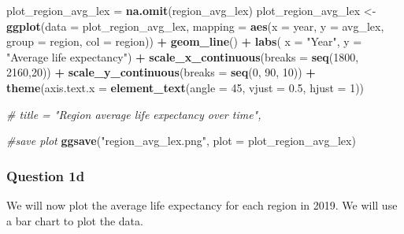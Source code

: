 \documentclass[
]{article}
\newenvironment{Shaded}{\begin{snugshade}}{\end{snugshade}}
\newcommand{\AttributeTok}[1]{\textcolor[rgb]{0.13,0.29,0.53}{#1}}
\newcommand{\CommentTok}[1]{\textcolor[rgb]{0.56,0.35,0.01}{\textit{#1}}}
\newcommand{\DecValTok}[1]{\textcolor[rgb]{0.00,0.00,0.81}{#1}}
\newcommand{\FloatTok}[1]{\textcolor[rgb]{0.00,0.00,0.81}{#1}}
\newcommand{\FunctionTok}[1]{\textcolor[rgb]{0.13,0.29,0.53}{\textbf{#1}}}
\newcommand{\NormalTok}[1]{#1}
\newcommand{\OtherTok}[1]{\textcolor[rgb]{0.56,0.35,0.01}{#1}}
\newcommand{\SpecialCharTok}[1]{\textcolor[rgb]{0.81,0.36,0.00}{\textbf{#1}}}
\newcommand{\StringTok}[1]{\textcolor[rgb]{0.31,0.60,0.02}{#1}}
\begin{document}
\begin{Shaded}
\begin{Highlighting}[]
\NormalTok{plot\_region\_avg\_lex }\OtherTok{=} \FunctionTok{na.omit}\NormalTok{(region\_avg\_lex)}
\NormalTok{plot\_region\_avg\_lex }\OtherTok{\textless{}{-}} \FunctionTok{ggplot}\NormalTok{(}\AttributeTok{data =}\NormalTok{ plot\_region\_avg\_lex, }\AttributeTok{mapping =} \FunctionTok{aes}\NormalTok{(}\AttributeTok{x =}\NormalTok{ year, }\AttributeTok{y =}\NormalTok{ avg\_lex, }\AttributeTok{group =}\NormalTok{ region, }\AttributeTok{col =}\NormalTok{ region)) }\SpecialCharTok{+}
  \FunctionTok{geom\_line}\NormalTok{() }\SpecialCharTok{+}
  \FunctionTok{labs}\NormalTok{(}
       \AttributeTok{x =} \StringTok{"Year"}\NormalTok{,}
       \AttributeTok{y =} \StringTok{"Average life expectancy"}\NormalTok{) }\SpecialCharTok{+}
  \FunctionTok{scale\_x\_continuous}\NormalTok{(}\AttributeTok{breaks =} \FunctionTok{seq}\NormalTok{(}\DecValTok{1800}\NormalTok{, }\DecValTok{2160}\NormalTok{,}\DecValTok{20}\NormalTok{)) }\SpecialCharTok{+}
  \FunctionTok{scale\_y\_continuous}\NormalTok{(}\AttributeTok{breaks =} \FunctionTok{seq}\NormalTok{(}\DecValTok{0}\NormalTok{, }\DecValTok{90}\NormalTok{, }\DecValTok{10}\NormalTok{)) }\SpecialCharTok{+}
  \FunctionTok{theme}\NormalTok{(}\AttributeTok{axis.text.x =} \FunctionTok{element\_text}\NormalTok{(}\AttributeTok{angle =} \DecValTok{45}\NormalTok{, }\AttributeTok{vjust =} \FloatTok{0.5}\NormalTok{, }\AttributeTok{hjust =} \DecValTok{1}\NormalTok{))}
  
\CommentTok{\# title = "Region average life expectancy over time",}

\CommentTok{\#save plot}
\FunctionTok{ggsave}\NormalTok{(}\StringTok{"region\_avg\_lex.png"}\NormalTok{, }\AttributeTok{plot =}\NormalTok{ plot\_region\_avg\_lex)}
\end{Highlighting}
\end{Shaded}

\hypertarget{question-1d}{%
\subsubsection{Question 1d}\label{question-1d}}

We will now plot the average life expectancy for each region in 2019. We
will use a bar chart to plot the data.
\end{document}
